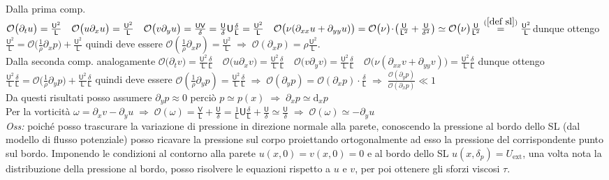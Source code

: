 \documentclass[11pt,a4paper]{report}
\newcommand{\de}{\mathrm d}
\begin{document}
{	Dalla prima comp. $\mathcal O\big(\partial_t u\big)=\frac{\mathsf U^2}{\mathsf L}\quad
\mathcal O\big(u\partial_xu\big)=\frac{\mathsf U^2}{\mathsf L}\quad
\mathcal O\big(v\partial_yu\big)=\frac{\mathsf U\mathsf V}{\delta}=\frac{\mathsf U}{\delta}\mathsf U\frac{\delta}{\mathsf L}=\frac{\mathsf U^2}{\mathsf L}\quad
\mathcal O\big(\nu(\partial_{xx}u+\partial_{yy}u)\big)=\mathcal O\big(\nu\big)\!\cdot\!\big(\frac{\mathsf U}{\mathsf L^2}+\frac{\mathsf U}{\delta^2}\big)\simeq\mathcal O\big(\nu\big)\frac{\mathsf U}{\mathsf L^2}\overset{(\ref{def sl})}{=}\frac{\mathsf U^2}{\mathsf L}$\quad dunque ottengo $\frac{\mathsf U^2}{\mathsf L}=\mathcal O\big(\frac 1\rho\partial_xp\big)+\frac{\mathsf U^2}{\mathsf L}$ quindi deve essere $\mathcal O(\frac 1\rho\partial_xp)=\frac{\mathsf U^2}{\mathsf L}\;\Rightarrow\;\mathcal O(\partial_xp)=\rho\frac{\mathsf U^2}{\mathsf L}$.\\
	Dalla seconda comp. analogamente $\mathcal O\big(\partial_t v\big)=\frac{\mathsf U^2}{\mathsf L}\frac{\delta}{\mathsf L}\quad
\mathcal O\big(u\partial_xv\big)=\frac{\mathsf U^2}{\mathsf L}\frac{\delta}{\mathsf L}\quad
\mathcal O\big(v\partial_yv\big)=\frac{\mathsf U^2}{\mathsf L}\frac{\delta}{\mathsf L}\quad
\mathcal O\big(\nu(\partial_{xx}v+\partial_{yy}v)\big)=\frac{\mathsf U^2}{\mathsf L}\frac{\delta}{\mathsf L}$\quad
dunque ottengo $\frac{\mathsf U^2}{\mathsf L}\frac{\delta}{\mathsf L}=\mathcal O\big(\frac 1\rho\partial_yp\big)+\frac{\mathsf U^2}{\mathsf L}\frac{\delta}{\mathsf L}$ quindi deve essere $\mathcal O(\frac 1\rho\partial_yp)=\frac{\mathsf U^2}{\mathsf L}\frac{\delta}{\mathsf L}\;\Rightarrow\;\mathcal O(\partial_yp)=\mathcal O(\partial_xp)\!\cdot\!\frac{\delta}{\mathsf L}\;\Rightarrow\;\frac{\mathcal O(\partial_yp)}{\mathcal O(\partial_xp)}\ll 1$\\
Da questi risultati posso assumere $\partial_yp\approx 0$ perciò $p\simeq p(x)\;\Rightarrow\;\partial_x p\simeq\de _xp\qquad$\\
	Per la vorticità $\omega=\partial_xv-\partial_yu\;\Rightarrow\;\mathcal O(\omega)=\frac{\mathsf V}{\mathsf L}+\frac{\mathsf U}{\delta}=\frac 1{\mathsf L}\mathsf U\frac{\delta}{\mathsf L}+\frac{\mathsf U}{\delta}\simeq\frac{\mathsf U}{\delta}\;\Rightarrow\;\mathcal O(\omega)\simeq-\partial_yu$\\
	\textit{Oss:} poiché posso trascurare la variazione di pressione in direzione normale alla parete, conoscendo la pressione al bordo dello SL (dal modello di flusso potenziale) posso ricavare la pressione sul corpo proiettando ortogonalmente ad esso la pressione del corrispondente punto sul bordo. Imponendo le condizioni al contorno alla parete $u(x,0)=v(x,0)=0$ e al bordo dello SL $u(x,\delta_p)=U_\mathrm{ext}$, una volta nota la distribuzione della pressione al bordo, posso risolvere le equazioni rispetto a $u$ e $v$, per poi ottenere gli sforzi viscosi $\tau$.
		
}
\end{document}
